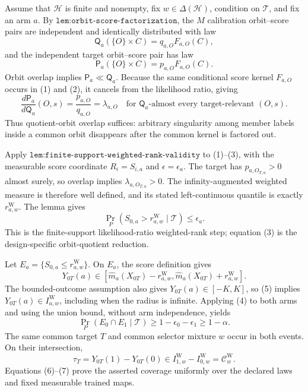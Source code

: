 Assume that \(\mathcal H\) is finite and nonempty, fix \(w\in\Delta(\mathcal H)\), condition on \(\mathcal T\), and fix an arm \(a\). By \(\texttt{lem:orbit-score-factorization}\), the \(M\) calibration orbit--score pairs are independent and identically distributed with law
\[
\mathsf Q_a(\{O\}\times C)=q_{a,O}F_{a,O}(C),
\tag{1}
\]
and the independent target orbit--score pair has law
\[
\mathsf P_a(\{O\}\times C)=p_{a,O}F_{a,O}(C).
\tag{2}
\]
Orbit overlap implies \(\mathsf P_a\ll\mathsf Q_a\). Because the same conditional score kernel \(F_{a,O}\) occurs in (1) and (2), it cancels from the likelihood ratio, giving
\[
\frac{d\mathsf P_a}{d\mathsf Q_a}(O,s)=\frac{p_{a,O}}{q_{a,O}}=\lambda_{a,O}
\quad\text{for }\mathsf Q_a\text{-almost every target-relevant }(O,s).
\tag{3}
\]
Thus quotient-orbit overlap suffices: arbitrary singularity among member labels inside a common orbit disappears after the common kernel is factored out.

Apply \(\texttt{lem:finite-support-weighted-rank-validity}\) to (1)--(3), with the measurable score coordinate \(R_i=S_{i,a}\) and \(\epsilon=\epsilon_a\). The target has \(p_{a,O_{T,a}}>0\) almost surely, so overlap implies \(\lambda_{a,O_{T,a}}>0\). The infinity-augmented weighted measure is therefore well defined, and its stated left-continuous quantile is exactly \(r^{\mathrm W}_{a,w}\). The lemma gives
\[
\Pr_P\!\left(S_{0,a}>r^{\mathrm W}_{a,w}\mid\mathcal T\right)\le\epsilon_a.
\tag{4}
\]
This is the finite-support likelihood-ratio weighted-rank step; equation (3) is the design-specific orbit-quotient reduction.

Let \(E_a=\{S_{0,a}\le r^{\mathrm W}_{a,w}\}\). On \(E_a\), the score definition gives
\[
Y_{0T}(a)\in[\widehat m_a(X_{0T})-r^{\mathrm W}_{a,w},\widehat m_a(X_{0T})+r^{\mathrm W}_{a,w}].
\tag{5}
\]
The bounded-outcome assumption also gives \(Y_{0T}(a)\in[-K,K]\), so (5) implies \(Y_{0T}(a)\in I^{\mathrm W}_{a,w}\), including when the radius is infinite. Applying (4) to both arms and using the union bound, without arm independence, yields
\[
\Pr_P(E_0\cap E_1\mid\mathcal T)\ge1-\epsilon_0-\epsilon_1\ge1-\alpha.
\tag{6}
\]
The same common target \(T\) and common selector mixture \(w\) occur in both events. On their intersection,
\[
\tau_T=Y_{0T}(1)-Y_{0T}(0)\in I^{\mathrm W}_{1,w}-I^{\mathrm W}_{0,w}=\mathcal C^{\mathrm W}_w.
\tag{7}
\]
Equations (6)--(7) prove the asserted coverage uniformly over the declared laws and fixed measurable trained maps.

